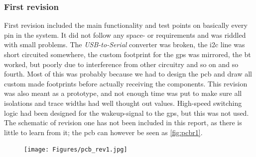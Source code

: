 \subsubsection{First revision}
First revision included the main functionality and test points on basically every pin in the system. It did not follow any space- or requirements and was riddled with small problems. The \emph{USB-to-Serial} converter was broken, the \gls{i2c} line was short circuited somewhere, the custom footprint for the \gls{gps} was mirrored, the \gls{bt} worked, but poorly due to interference from other circuitry and so on and so fourth. Most of this was probably because we had to design the \gls{pcb} and draw all custom made footprints before actually receiving the components. This revision was also meant as a prototype, and not enough time was put to make sure all isolations and trace widths had well thought out values. High-speed switching logic had been designed for the wakeup-signal to the \gls{gps}, but this was not used. The schematic of revision one has not been included in this report, as there is little to learn from it; the \gls{pcb} can however be seen as \autoref{fig:pcbr1}.
\begin{figure}[H]
	\centering
    \texttt{[image: Figures/pcb\_rev1.jpg]}
	\label{fig:pcbr1}
\end{figure}

